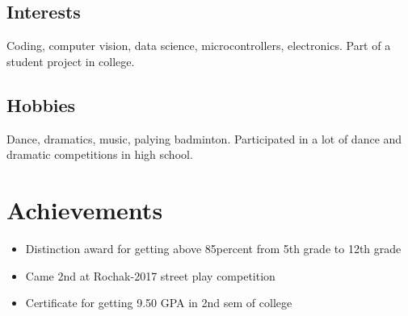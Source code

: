 \documentclass[10pt]{article}
\begin{document}
\subsection{Interests}
Coding, computer vision, data science, microcontrollers, electronics.
\newline
Part of a student project in college.
\subsection{Hobbies}
Dance, dramatics, music, palying badminton.
\newline
Participated in a lot of dance and dramatic competitions in high school.

\section{Achievements}
\begin{itemize}
\item Distinction award for getting above 85percent from 5th grade to 12th grade
\item Came 2nd at Rochak-2017 street play competition
\item Certificate for getting 9.50 GPA in 2nd sem of college
\end{itemize}
\end{document}
